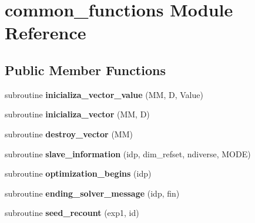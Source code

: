 \hypertarget{classcommon__functions}{\section{common\-\_\-functions Module Reference}
\label{classcommon__functions}
}
\subsection*{Public Member Functions}
\begin{DoxyCompactItemize}
\item 
\hypertarget{classcommon__functions_aea73f4d848af9fb829ab0e90cc78c4ef}{subroutine {\bfseries inicializa\-\_\-vector\-\_\-value} (M\-M, D, Value)}\label{classcommon__functions_aea73f4d848af9fb829ab0e90cc78c4ef}

\item 
\hypertarget{classcommon__functions_ab0b7fb191180659886b14972ab382fb9}{subroutine {\bfseries inicializa\-\_\-vector} (M\-M, D)}\label{classcommon__functions_ab0b7fb191180659886b14972ab382fb9}

\item 
\hypertarget{classcommon__functions_aed46992d001cb8a2b094f86e842de9bc}{subroutine {\bfseries destroy\-\_\-vector} (M\-M)}\label{classcommon__functions_aed46992d001cb8a2b094f86e842de9bc}

\item 
\hypertarget{classcommon__functions_ac461bb63cf2826114d723c24259d97b3}{subroutine {\bfseries slave\-\_\-information} (idp, dim\-\_\-refset, ndiverse, M\-O\-D\-E)}\label{classcommon__functions_ac461bb63cf2826114d723c24259d97b3}

\item 
\hypertarget{classcommon__functions_aeafc83ed99317cf268fad2e7413bdb8d}{subroutine {\bfseries optimization\-\_\-begins} (idp)}\label{classcommon__functions_aeafc83ed99317cf268fad2e7413bdb8d}

\item 
\hypertarget{classcommon__functions_a1e45cb5417768d4b3df919fc565c0a62}{subroutine {\bfseries ending\-\_\-solver\-\_\-message} (idp, fin)}\label{classcommon__functions_a1e45cb5417768d4b3df919fc565c0a62}

\item 
\hypertarget{classcommon__functions_a4c01bb3ed5888ea3170b22ecf65a9477}{subroutine {\bfseries seed\-\_\-recount} (exp1, id)}\label{classcommon__functions_a4c01bb3ed5888ea3170b22ecf65a9477}


\end{DoxyCompactItemize}
